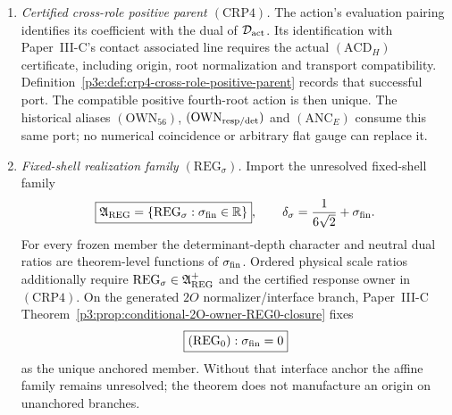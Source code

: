 \documentclass[12pt,a4paper]{article}
\begin{document}
\begin{definition}
\begin{enumerate}[label=(\roman*)]
\begin{corollary}
\label{p3e:cor:typed-planck-normalization}
For the scalar-resolution coordinate
$G_{\rm scal}=c_{\rm op}^3/(2\pi\hbar U)$ put
$\ell_{\rm scal}^2=\hbar G_{\rm scal}/c_{\rm op}^3$. Then
\[
 \boxed{2\pi U=\ell_{\rm scal}^{-2}.}
\]
Only after $(\mathrm{CELL}_{K\to U})$ does one additionally have
\[
 2\pi U=6\mathcal K_p,\qquad
 \Rmom=6\ell_{\rm scal},\qquad
 4\pi^2U^2=36\mathcal K_p^2=\ell_{\rm scal}^{-4}.
\]
This scalar coordinate is not silently the Planck length of the raw joint
or the final physically matched action.
\end{corollary}
\begin{proof}
Substitute the definition of $G_{\rm scal}$, then the evaluated cell test.
No trace rescaling or measured Newton value enters the algebra.
\end{proof}

\item \emph{Certified cross-role positive parent $(\mathrm{CRP4})$.}
The action's evaluation pairing identifies its coefficient with the dual of
$\mathcal D_{\rm act}$. Its identification with Paper~III-C's contact
associated line requires the actual $(\mathrm{ACD}_H)$ certificate,
including origin, root normalization and transport compatibility.
Definition~\ref{p3e:def:crp4-cross-role-positive-parent} records that
successful port. The compatible positive fourth-root action is then unique.
The historical aliases $(\mathrm{OWN}_{56})$,
$(\mathrm{OWN}_{\rm resp/det})$ and $(\mathrm{ANC}_E)$ consume this same
port; no numerical coincidence or arbitrary flat gauge can replace it.

\item \emph{Fixed-shell realization family \((\mathrm{REG}_{\sigma})\).}
Import the unresolved fixed-shell family
\[
 \boxed{\mathfrak A_{\rm REG}
 =\{\mathrm{REG}_{\sigma}:\sigma_{\rm fin}\in\mathbb R\}},
 \qquad
 \delta_{\sigma}=\frac1{6\sqrt2}+\sigma_{\rm fin}.
\]
For every frozen member the determinant-depth character and neutral dual
ratios are theorem-level functions of \(\sigma_{\rm fin}\).  Ordered physical
scale ratios additionally require
\(\mathrm{REG}_\sigma\in\mathfrak A_{\rm REG}^{+}\) and the certified response
owner in \((\mathrm{CRP4})\).  On the generated \(2O\)
normalizer/interface branch, Paper~III-C
Theorem~\ref{p3:prop:conditional-2O-owner-REG0-closure} fixes
\[
 \boxed{(\mathrm{REG}_0):\sigma_{\rm fin}=0}
\]
as the unique anchored member.  Without that interface anchor the affine
family remains unresolved; the theorem does not manufacture an origin on
unanchored branches.


\end{enumerate}
\end{definition}
\end{document}
